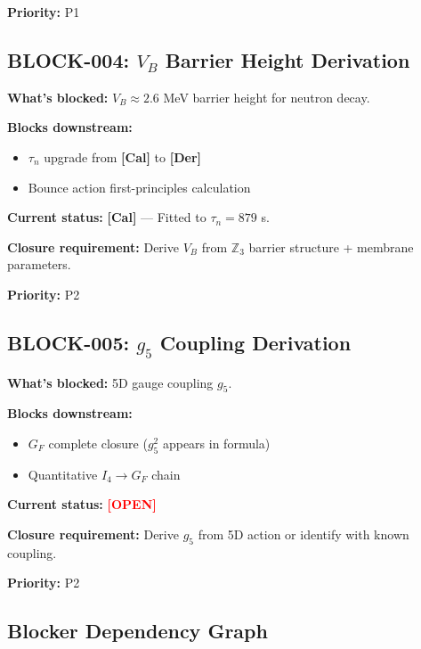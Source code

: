 \documentclass[11pt,a4paper]{article}
\newcommand{\tagDer}{\textcolor{green!50!black}{\textbf{[Der]}}}
\newcommand{\tagCal}{\textcolor{purple!70!black}{\textbf{[Cal]}}}
\newcommand{\tagOPEN}{\textcolor{red}{\textbf{[OPEN]}}}
\begin{document}
\textbf{Priority:} P1

\subsection{BLOCK-004: $V_B$ Barrier Height Derivation}

\textbf{What's blocked:} $V_B \approx 2.6$ MeV barrier height for neutron decay.

\textbf{Blocks downstream:}
\begin{itemize}[nosep]
    \item $\tau_n$ upgrade from \tagCal{} to \tagDer{}
    \item Bounce action first-principles calculation
\end{itemize}

\textbf{Current status:} \tagCal{} --- Fitted to $\tau_n = 879$ s.

\textbf{Closure requirement:} Derive $V_B$ from $\mathbb{Z}_3$ barrier structure + membrane parameters.

\textbf{Priority:} P2

\subsection{BLOCK-005: $g_5$ Coupling Derivation}

\textbf{What's blocked:} 5D gauge coupling $g_5$.

\textbf{Blocks downstream:}
\begin{itemize}[nosep]
    \item $G_F$ complete closure ($g_5^2$ appears in formula)
    \item Quantitative $I_4 \to G_F$ chain
\end{itemize}

\textbf{Current status:} \tagOPEN{}

\textbf{Closure requirement:} Derive $g_5$ from 5D action or identify with known coupling.

\textbf{Priority:} P2

\subsection{Blocker Dependency Graph}
\end{document}
